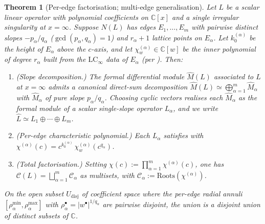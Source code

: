 \documentclass[aip,jmp,preprint,amsmath,amssymb,nofootinbib,floatfix]{revtex4-2}
\theoremstyle{plain}
\newtheorem{theorem}{Theorem}[section]
\theoremstyle{definition}
\theoremstyle{remark}
\newcommand{\LCinf}{\mathrm{LC}_\infty}
\newcommand{\Roots}{\mathrm{Roots}}
\newcommand{\NL}{N(L)}
\newcommand{\Cl}{\mathcal{C}}
\begin{document}
\begin{theorem}[Per-edge factorisation; multi-edge generalisation]\label{thm:M1}
Let $L$ be a scalar linear operator with polynomial coefficients on
$\mathbb{C}[x]$ and a single irregular singularity at $x = \infty$. Suppose
$\NL$ has edges $E_1, \dots, E_m$ with pairwise distinct slopes
$-p_\alpha / q_\alpha$ ($\gcd(p_\alpha, q_\alpha) = 1$) and $r_\alpha + 1$
lattice points on $E_\alpha$. Let $k_0^{(\alpha)}$ be the height of $E_\alpha$
above the $c$-axis, and let $\chi_w^{(\alpha)} \in \mathbb{C}[w]$ be the
inner polynomial of degree $r_\alpha$ built from the $\LCinf$ data of
$E_\alpha$ (per ). Then:
\begin{enumerate}[leftmargin=2em]
\item (Slope decomposition.) The formal differential module
      $\widehat{M}(L)$ associated to $L$ at $x = \infty$ admits a canonical
      direct-sum decomposition $\widehat{M}(L) \simeq \bigoplus_{\alpha=1}^{m}
      \widehat{M}_\alpha$ with $\widehat{M}_\alpha$ of pure slope
      $p_\alpha / q_\alpha$. Choosing cyclic vectors realises each
      $\widehat{M}_\alpha$ as the formal module of a scalar single-slope
      operator $L_\alpha$, and we write
      $\widehat{L} \simeq L_1 \oplus \cdots \oplus L_m$.
\item (Per-edge characteristic polynomial.) Each $L_\alpha$ satisfies
       with
      $\chi^{(\alpha)}(c) = c^{k_0^{(\alpha)}}\, \chi_w^{(\alpha)}(c^{q_\alpha})$.
\item (Total factorisation.) Setting $\chi(c) := \prod_{\alpha=1}^{m}
      \chi^{(\alpha)}(c)$, one has
      $\Cl(L) = \bigsqcup_{\alpha=1}^{m} \Cl_\alpha$ as multisets, with
      $\Cl_\alpha := \Roots(\chi^{(\alpha)})$.
\end{enumerate}
On the open subset $U_{\mathrm{disj}}$ of coefficient space where the
per-edge radial annuli $[\rho_\alpha^{\min}, \rho_\alpha^{\max}]$ with
$\rho_\alpha^{\bullet} = |w^\bullet|^{1/q_\alpha}$ are pairwise disjoint,
the union is a disjoint union of \emph{distinct} subsets of $\mathbb{C}$.
\end{theorem}
\end{document}
